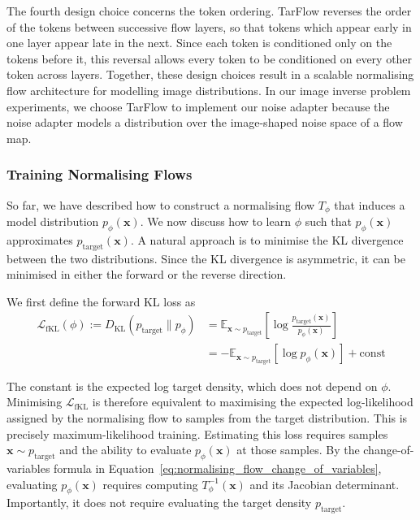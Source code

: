 \documentclass[12pt,a4paper]{report}
\begin{document}
The fourth design choice concerns the token ordering. TarFlow reverses the order of the tokens between successive flow layers, so that tokens which appear early in one layer appear late in the next. Since each token is conditioned only on the tokens before it, this reversal allows every token to be conditioned on every other token across layers. Together, these design choices result in a scalable normalising flow architecture for modelling image distributions. In our image inverse problem experiments, we choose TarFlow to implement our noise adapter because the noise adapter models a distribution over the image-shaped noise space of a flow map.

\subsubsection{Training Normalising Flows}
\label{subsubsec:training_normalising_flows}
So far, we have described how to construct a normalising flow $T_{\phi}$ that induces a model distribution $p_{\phi}(\mathbf{x})$. We now discuss how to learn $\phi$ such that $p_{\phi}(\mathbf{x})$ approximates $p_{\mathrm{target}}(\mathbf{x})$. A natural approach is to minimise the KL divergence between the two distributions. Since the KL divergence is asymmetric, it can be minimised in either the forward or the reverse direction.

We first define the forward KL loss as
\begin{align}
\mathcal{L}_{\mathrm{fKL}}(\phi)
:=
D_{\mathrm{KL}}\left(p_{\mathrm{target}}\parallel p_{\phi}\right)
&=
\mathbb{E}_{\mathbf{x}\sim p_{\mathrm{target}}}
\left[
\log\frac{p_{\mathrm{target}}(\mathbf{x})}{p_{\phi}(\mathbf{x})}
\right]
\nonumber
\\
&=
-\mathbb{E}_{\mathbf{x}\sim p_{\mathrm{target}}}
\left[\log p_{\phi}(\mathbf{x})\right]
+
\mathrm{const}
\label{eq:normalising_flow_forward_kl}
\end{align}

The constant is the expected log target density, which does not depend on $\phi$. Minimising
$\mathcal{L}_{\mathrm{fKL}}$ is therefore equivalent to maximising the
expected log-likelihood assigned by the normalising flow to samples
from the target distribution. This is precisely maximum-likelihood training.
Estimating this loss requires samples $\mathbf{x}\sim p_{\mathrm{target}}$ and the ability to evaluate $p_{\phi}(\mathbf{x})$ at those samples. By the change-of-variables formula in Equation~\ref{eq:normalising_flow_change_of_variables}, evaluating $p_{\phi}(\mathbf{x})$ requires computing $T_{\phi}^{-1}(\mathbf{x})$ and its Jacobian determinant. Importantly, it does not require evaluating the target density $p_{\mathrm{target}}$.
\end{document}
